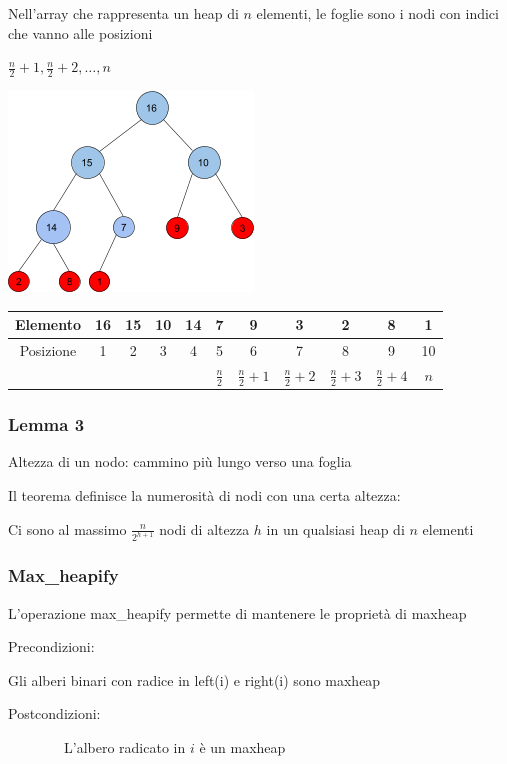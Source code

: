 \documentclass{article}
\begin{document}
{{{{{Nell'array che rappresenta un heap di $n$ elementi, le foglie sono i nodi con indici che vanno alle posizioni}

$\frac{n}{2}+1,\frac{n}{2}+2,\ldots,n$

\includegraphics{images/image526.png}

\begin{tabular}{|c|c|c|c|c|c|c|c|c|c|c|}
\hline 
Elemento & 16 & 15 & 10 & 14 & 7 & 9 & 3 & 2 & 8 & 1 \\ 
\hline 
Posizione & 1 & 2 & 3 & 4 & 5 & 6 & 7 & 8 & 9 & 10 \\ 
\hline 
 &  &  &  &  & $\frac{n}{2}$ & $\frac{n}{2}+1$ & $\frac{n}{2}+2$ & $\frac{n}{2}+3$ & $\frac{n}{2}+4$ & $n$ \\ 
\hline 
\end{tabular} 

\subsubsection{Lemma 3}

{Altezza di un nodo: cammino più lungo verso una foglia}

{Il teorema definisce la numerosità di nodi con una certa altezza:}

{Ci sono al massimo $\frac{n}{2^{h+1}}$ nodi di altezza $h$ in
un qualsiasi heap di $n$ elementi}

\subsubsection{Max\_heapify}}}

{L'operazione max\_heapify permette di mantenere le proprietà di maxheap}

{Precondizioni:}

{Gli alberi binari con radice in left(i) e right(i) sono maxheap}

{Postcondizioni:}

{~~~~~~~~L'albero radicato in $i$ è un maxheap}

}}
\end{document}
